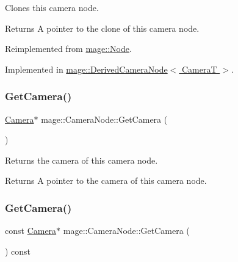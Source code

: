 Clones this camera node.

\begin{DoxyReturn}{Returns}
A pointer to the clone of this camera node. 
\end{DoxyReturn}


Reimplemented from \hyperlink{classmage_1_1_node_a71a4763bfd4cba5653488b490e61dc8f}{mage\+::\+Node}.



Implemented in \hyperlink{classmage_1_1_derived_camera_node_aa965751029ebd6b41d3805b499a8304e}{mage\+::\+Derived\+Camera\+Node$<$ Camera\+T $>$}.

\hypertarget{classmage_1_1_camera_node_aa9887e3bf192d6c078aae2430732cbf8}{}\label{classmage_1_1_camera_node_aa9887e3bf192d6c078aae2430732cbf8} 
\subsubsection{\texorpdfstring{Get\+Camera()}{GetCamera()}\hspace{0.1cm}{\footnotesize\ttfamily [1/2]}}
{\footnotesize\ttfamily \hyperlink{classmage_1_1_camera}{Camera}$\ast$ mage\+::\+Camera\+Node\+::\+Get\+Camera (\begin{DoxyParamCaption}{ }\end{DoxyParamCaption})\hspace{0.3cm}{\ttfamily [noexcept]}}

Returns the camera of this camera node.

\begin{DoxyReturn}{Returns}
A pointer to the camera of this camera node. 
\end{DoxyReturn}
\hypertarget{classmage_1_1_camera_node_aa911263cfce8cec2a42c6d03d25af606}{}\label{classmage_1_1_camera_node_aa911263cfce8cec2a42c6d03d25af606} 
\subsubsection{\texorpdfstring{Get\+Camera()}{GetCamera()}\hspace{0.1cm}{\footnotesize\ttfamily [2/2]}}
{\footnotesize\ttfamily const \hyperlink{classmage_1_1_camera}{Camera}$\ast$ mage\+::\+Camera\+Node\+::\+Get\+Camera (\begin{DoxyParamCaption}{ }\end{DoxyParamCaption}) const\hspace{0.3cm}{\ttfamily [noexcept]}}

